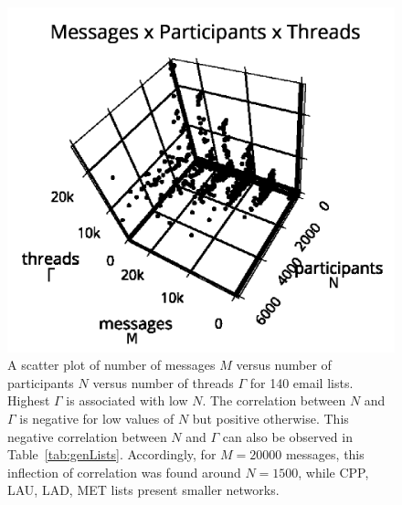 \begin{figure}
\centering
\includegraphics[trim={0 0 0 1cm},clip,width=.7\columnwidth]{figs/mpgamma2_}
\caption{A scatter plot of number of messages $M$ versus number of participants $N$ versus number of threads $\Gamma$ for 140 email lists.
Highest $\Gamma$ is associated with low $N$.
The correlation between $N$ and $\Gamma$ is negative for low values of $N$ but positive otherwise.
This negative correlation between $N$ and $\Gamma$ can also be observed in Table~\ref{tab:genLists}.
Accordingly, for $M=20000$ messages, this inflection
of correlation was found around $N=1500$, while CPP, LAU, LAD, MET lists 
present smaller networks.}
\label{fig:nmgamma3d}
\end{figure}





